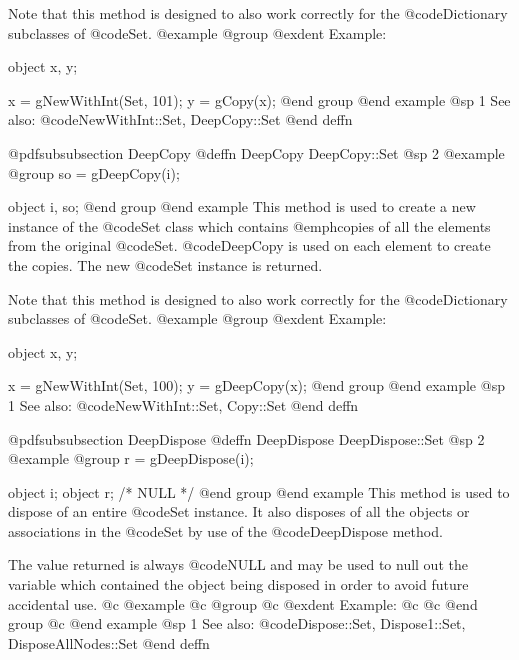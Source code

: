 Note that this method is designed to also work correctly for the
@code{Dictionary} subclasses of @code{Set}.
@example
@group
@exdent Example:

object  x, y;

x = gNewWithInt(Set, 101);
y = gCopy(x);
@end group
@end example
@sp 1
See also:  @code{NewWithInt::Set, DeepCopy::Set}
@end deffn













@pdfsubsubsection {DeepCopy}
@deffn {DeepCopy} DeepCopy::Set
@sp 2
@example
@group
so = gDeepCopy(i);

object  i, so;
@end group
@end example
This method is used to create a new instance of the @code{Set} class
which contains @emph{copies} of all the elements from the original @code{Set}.
@code{DeepCopy} is used on each element to create the copies.
The new @code{Set} instance is returned.

Note that this method is designed to also work correctly for the
@code{Dictionary} subclasses of @code{Set}.
@example
@group
@exdent Example:

object  x, y;

x = gNewWithInt(Set, 100);
y = gDeepCopy(x);
@end group
@end example
@sp 1
See also:  @code{NewWithInt::Set, Copy::Set}
@end deffn








@pdfsubsubsection {DeepDispose}
@deffn {DeepDispose} DeepDispose::Set
@sp 2
@example
@group
r = gDeepDispose(i);

object  i;
object  r;     /*  NULL  */
@end group
@end example
This method is used to dispose of an entire @code{Set} instance.  It also
disposes of all the objects or associations in the @code{Set} by use of the
@code{DeepDispose} method.  

The value returned is always @code{NULL} and may be used to null out
the variable which contained the object being disposed in order to
avoid future accidental use.
@c @example
@c @group
@c @exdent Example:
@c 
@c @end group
@c @end example
@sp 1
See also:  @code{Dispose::Set, Dispose1::Set, DisposeAllNodes::Set}
@end deffn











